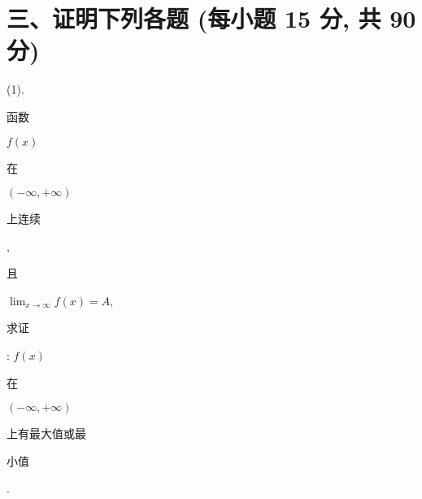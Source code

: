 \documentclass[10pt]{article}
\begin{document}
\section{三、证明下列各题 (每小题 15 分, 共 90 分)}
(1). \begin{CJK}{UTF8}{mj}函数\end{CJK} $f(x)$ \begin{CJK}{UTF8}{mj}在\end{CJK} $(-\infty,+\infty)$ \begin{CJK}{UTF8}{mj}上连续\end{CJK}, \begin{CJK}{UTF8}{mj}且\end{CJK} $\lim _{x \rightarrow \infty} f(x)=A$, \begin{CJK}{UTF8}{mj}求证\end{CJK}: $f(x)$ \begin{CJK}{UTF8}{mj}在\end{CJK} $(-\infty,+\infty)$ \begin{CJK}{UTF8}{mj}上有最大值或最\end{CJK} \begin{CJK}{UTF8}{mj}小值\end{CJK}.
\end{document}
